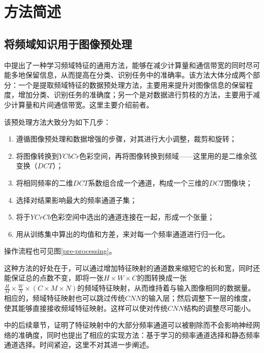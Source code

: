 \documentclass[UTF8]{ctexart}
\begin{document}
    \section{方法简述}\label{solution}
    
        \subsection{将频域知识用于图像预处理}
            \indent \cite{xu2020learning}中提出了一种学习频域特征的通用方法，能够在减少计算量和通信带宽的同时尽可能多地保留信息，从而提高在分类、识别任务中的准确率。该方法大体分成两个部分：一个是提取频域特征的数据预处理方法，主要用来提升对图像信息的保留程度，增加分类、识别任务的准确度；另一个是对数据进行剪枝的方法，主要用于减少计算量和片间通信带宽。这里主要介绍前者。
            
            \indent 该预处理方法大致分为如下几步：
            
    			\begin{enumerate}[leftmargin=50pt]
    				\item 遵循图像预处理和数据增强的步骤，对其进行大小调整，裁剪和旋转；
    				\item 将图像转换到$YCbCr$色彩空间，再将图像转换到频域——这里用的是二维余弦变换（$DCT$）；
    				\item 将相同频率的二维$DCT$系数组合成一个通道，构成一个三维的$DCT$图像块；
    				\item 选择对结果影响最大的频率通道子集；
    				\item 将于$YCrCb$色彩空间中选出的通道连接在一起，形成一个张量；
                    \item 用从训练集中算出的均值和方差，来对每一个频率通道进行归一化。
    			\end{enumerate}
            
            \indent 操作流程也可见图\ref{pre-processing}。
            
            \indent 这种方法的好处在于，可以通过增加特征映射的通道数来缩短它的长和宽，同时还能保证总的点数不变，即将一张$H \times W \times C$的图转换成一张$ \frac{H}{M} \times \frac{W}{N} \times (C \times M \times N ) $的频域特征映射，从而维持着与输入图像相同的数据量。相应的，频域特征映射也可以跳过传统$CNN$的输入层；然后调整下一层的维度，使其能够直接接收频域特征映射。这样可以使对传统$CNN$结构的调整尽可能小。
            
            \indent \cite{xu2020learning}中的后续章节，证明了特征映射中的大部分频率通道可以被剔除而不会影响神经网络的准确度，同时也提出了相应的实现方法：基于学习的频率通道选择和静态频率通道选择。时间紧迫，这里不对其进一步阐述。
            
\end{document}

